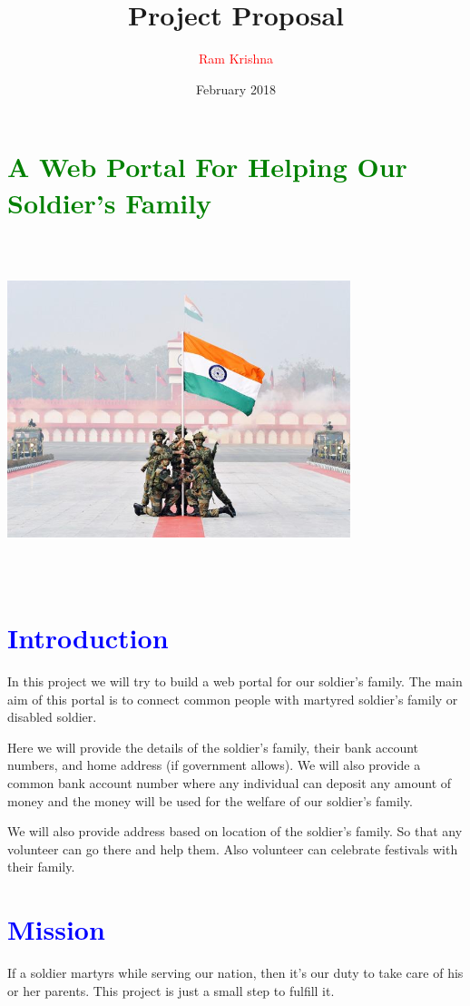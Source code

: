 \documentclass[11pt, a4paper, column]{article}
\title{{\huge Project Proposal}}
\author{\textcolor{red}{\Large Ram Krishna}}
\affil{2016csb1053}
\date{February 2018}
\begin{document}
\maketitle

\section*{\centering\textcolor{green}{A Web Portal For Helping Our Soldier's Family}}
\begin{center}
   \includegraphics[height=10cm,width=10cm]{img}
\end{center}
\newpage
\tableofcontents
\newpage
\section{\textcolor{blue}{Introduction}}
In this project we will try to build a web portal for our soldier's family. The main aim of this portal is to connect common people with martyred soldier's family or disabled soldier.

Here we will provide the details of the soldier's family, their bank account numbers, and home address (if government allows). We will also provide a common bank account number where any individual can deposit any amount of money and the money will be used for the welfare of our soldier's family. 

We will also provide address based on location of the soldier's family. So that any volunteer can go there and help them. Also volunteer can celebrate festivals with their family.

\section{\textcolor{blue}{Mission}}
If a soldier martyrs while serving our nation, then it's our duty to take care of his or her parents. This project is just a small step to fulfill it.
\end{document}
